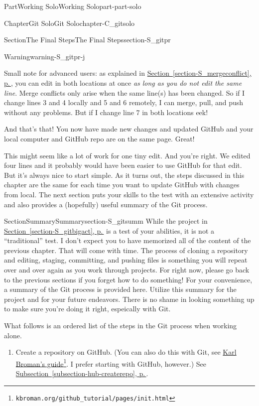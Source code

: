 \documentclass[twoside,10pt,]{book}
\newcommand{\xreffont}{\relax}
\begin{document}
\begin{partptx}{Part}{Working Solo}{}{Working Solo}{}{}{part-part-solo}
\begin{chapterptx}{Chapter}{Git Solo}{}{Git Solo}{}{}{chapter-C_gitsolo}
\begin{sectionptx}{Section}{The Final Steps}{}{The Final Steps}{}{}{section-S_gitpr}
\begin{warning}{Warning}{}{warning-S_gitpr-j}
\par
Small note for advanced users: as explained in \hyperref[section-S_mergeconflict]{Section~{\xreffont\ref{section-S_mergeconflict}}, p.\,\pageref{section-S_mergeconflict}}, you can edit in both locations at once \emph{as long as you do not edit the same line}. Merge conflicts only arise when the same line(s) has been changed. So if I change lines 3 and 4 locally and 5 and 6 remotely, I can merge, pull, and push without any problems. But if I change line 7 in both locations \textellipsis{} eek!%
\end{warning}
And that's that! You now have made new changes and updated GitHub and your local computer and GitHub repo are on the same page. Great!%
\par
This might seem like a lot of work for one tiny edit. And you're right. We edited four lines and it probably would have been easier to use GitHub for that edit. But it's always nice to start simple. As it turns out, the steps discussed in this chapter are the same for each time you want to update GitHub with changes from local. The next section puts your skills to the test with an extensive activity and also provides a (hopefully) useful summary of the Git process.%
\end{sectionptx}
%
%
\typeout{************************************************}
\typeout{************************************************}
%
\begin{sectionptx}{Section}{Summary}{}{Summary}{}{}{section-S_gitsumm}
%
While the project in \hyperref[section-S_gitbigact]{Section~{\xreffont\ref{section-S_gitbigact}}, p.\,\pageref{section-S_gitbigact}} is a test of your abilities, it is not a ``traditional'' test. I don't expect you to have memorized all of the content of the previous chapter. That will come with time. The process of cloning a repository and editing, staging, committing, and pushing files is something you will repeat over and over again as you work through projects. For right now, please go back to the previous sections if you forget how to do something! For your convenience, a summary of the Git process is provided here. Utilize this summary for the project and for your future endeavors. There is no shame in looking something up to make sure you're doing it right, espeically with Git.%
\par
What follows is an ordered list of the steps in the Git process when working alone.%
\begin{enumerate}
\item{}Create a repository on GitHub. (You can also do this with Git, see \href{https://kbroman.org/github_tutorial/pages/init.html}{Karl Broman's guide}\footnote{\nolinkurl{kbroman.org/github_tutorial/pages/init.html}\label{fn-S_gitsumm-d-a-a-a-b}}. I prefer starting with GitHub, however.) See \hyperref[subsection-hub-createrepo]{Subsection~{\xreffont\ref{subsection-hub-createrepo}}, p.\,\pageref{subsection-hub-createrepo}}.%

\end{enumerate}
\end{sectionptx}
\end{chapterptx}
\end{partptx}
\end{document}

